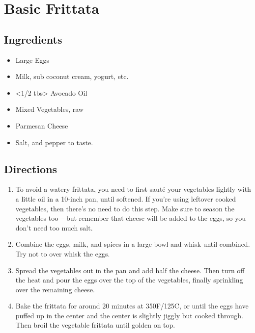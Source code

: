 \section{Basic Frittata}

\subsection{ Ingredients }

\begin{itemize}
  \item <12> Large Eggs
  \item <3 tbs> Milk, sub coconut cream, yogurt, etc.
  \item <1/2 tbs> Avocado Oil 
  \item <5 cups> Mixed Vegetables, raw
  \item <1 oz> Parmesan Cheese
  \item <1 tsp> Salt, and pepper to taste. 
\end{itemize}

\subsection{ Directions }

\begin{enumerate}
  \item To avoid a watery frittata, you need to first sauté your vegetables lightly with a little oil in a 10-inch pan, until softened. If you’re using leftover cooked vegetables, then there’s no need to do this step. Make sure to season the vegetables too – but remember that cheese will be added to the eggs, so you don’t need too much salt.
  \item Combine the eggs, milk, and spices in a large bowl and whisk until combined. Try not to over whisk the eggs.
  \item Spread the vegetables out in the pan and add half the cheese. Then turn off the heat and pour the eggs over the top of the vegetables, finally sprinkling over the remaining cheese.
  \item Bake the frittata for around 20 minutes at 350F/125C, or until the eggs have puffed up in the center and the center is slightly jiggly but cooked through. Then broil the vegetable frittata until golden on top.
\end{enumerate}
